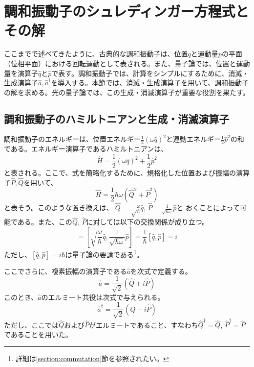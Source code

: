 \section{調和振動子のシュレディンガー方程式とその解}
ここまでで述べてきたように、古典的な調和振動子は、位置$q$と運動量$p$の平面（位相平面）における回転運動として表される。また、量子論では、位置と運動量を演算子$\hat q$と$\hat p$で表す。調和振動子では、計算をシンプルにするために、消滅・生成演算子$\hat a, \hat a^\dagger$を導入する。本節では、消滅・生成演算子を用いて、調和振動子の解を求める。光の量子論では、この生成・消滅演算子が重要な役割を果たす。

\subsection{調和振動子のハミルトニアンと生成・消滅演算子}
調和振動子のエネルギーは、位置エネルギー$\frac{1}{2}(\omega \hat q)^2 $と運動エネルギー$\frac{1}{2}\hat p^2 $の和である。エネルギー演算子であるハミルトニアンは、
\begin{equation}
  \hat H = \frac{1}{2}(\omega \hat q)^2 + \frac 1 2 \hat p^2
\end{equation}
と表される。ここで、式を簡略化するために、規格化した位置および振幅の演算子$\hat P, \hat Q$を用いて、
\begin{equation}
  \hat H = \frac 1 2 \hbar \omega (\hat Q ^2 + \hat P^2)
\end{equation}
と表そう。このような置き換えは、
$\hat Q = \sqrt \frac{\omega}{\hbar} \hat q$, 
$\hat P = \frac{1}{\sqrt{\hbar \omega}}\hat p$と
おくことによって可能である。また、この$\hat Q$, $\hat P$に対しては以下の交換関係が成り立つ。
\begin{equation}
  [\hat Q, \hat P] = \left[\sqrt{\frac{\omega}{\hbar}}\hat q, \frac{1}{\sqrt{\hbar \omega}}\hat p \right] = \frac{1}{\hbar}[\hat q, \hat p] = i
  \label{eq:commutation_Q_P}
\end{equation}
ただし、$[\hat q, \hat p] = i\hbar$は量子論の要請である\footnote{詳細は\ref{section:commutation}節を参照されたい。}。

ここでさらに、複素振幅の演算子である$\hat a$を次式で定義する。
\begin{equation}
  \hat a = \frac{1}{\sqrt 2}(\hat Q + i\hat P)
  \label{eq:annihilation_operator}
\end{equation}
このとき、$\hat a$のエルミート共役は次式で与えられる。
\begin{equation}
  \hat a^\dagger = \frac{1}{\sqrt 2}(\hat Q - i\hat P)
  \label{eq:creation_operator}
\end{equation}
ただし、ここでは$\hat Q$および$\hat P$がエルミートであること、すなわち$\hat Q^\dagger = \hat Q$, $\hat P^\dagger = \hat P$であることを用いた。

